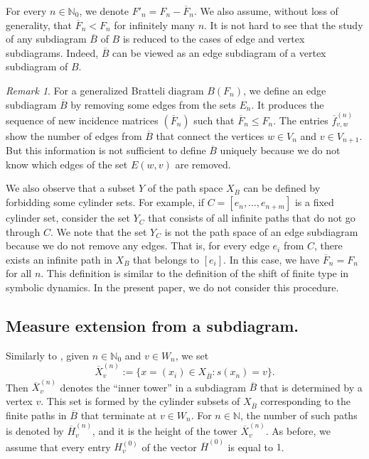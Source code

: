 \documentclass[11pt,reqno]{amsart}
\theoremstyle{definition}
\theoremstyle{remark}
\newtheorem{remark}[definition]{Remark}
\theoremstyle{plain}
\def\ol{\overline}
\newcommand{\N}{\mathbb N}
\numberwithin{equation}{section}
\begin{document}
 For every $n \in \N_0$, we denote $F'_n = F_n - \overline{F}_n$. We also assume, without loss of generality, that  $\overline{F}_n < F_n$ for infinitely many $n$. It is not hard to see that the study of any subdiagram $\ol B$ of $B$ is reduced to the cases of edge and vertex subdiagrams. Indeed, $\ol B$ can be viewed as an edge subdiagram of a vertex subdiagram of $B$.

\begin{remark}\label{rem on edge diagram}
For a generalized Bratteli diagram $B(F_n)$, we define an edge subdiagram $\ol B$ by removing some edges from the sets $E_n$. It produces the sequence of new incidence matrices $(\ol F_n)$ such that $\ol F_n \leq F_n$. The entries $\ol f^{(n)}_{v, w}$ show the number of edges from $\ol B$ that connect the vertices $w \in V_n$ and $v\in V_{n+1}$. But this information is not sufficient to define $\ol B$ uniquely because we do not know which edges of 
the set $E(w, v)$ are removed.

We also observe that a subset $Y$ of the path space $X_B$ can be defined by forbidding some cylinder sets. For example, if $C = [e_n, \ldots, e_{n+m}]$ is a fixed cylinder set, consider the set $Y_C$ that consists of all infinite paths that do not go through $C$. We note that the set $Y_C$ is not the path space of an edge subdiagram because we do not remove any edges. That is, for every edge $e_i$ from $C$, there exists an infinite path in $X_B$ that belongs to $[e_i]$. In this case, we have $\ol F_n = F_n$ for all $n$. This definition is similar to the definition of the shift of finite type in symbolic dynamics. In the present paper, we do not consider this procedure.  
\end{remark}


\subsection{Measure extension from a subdiagram.} 

 Similarly to , given $n \in \N_0$ and $v \in W_n$, we set 
\[
\overline{X}_v^{(n)} := \{x = (x_i)\in X_{\overline B} : s(x_{n}) = v\}.
\]
Then $\overline{X}_v^{(n)}$ denotes the ``inner tower'' in a subdiagram $\overline{B}$ that is determined by a vertex $v$. This set is formed by the cylinder subsets of $X_{\ol B}$ corresponding to the finite paths in $\ol B$ that terminate at $v \in W_n$. For $n \in \N$, the number of such paths is denoted by $\overline{H}_v^{(n)}$, and it is the height of the tower $\ol X_v^{(n)}$. As before, we assume that every entry $H_{v}^{(0)}$ of the vector $\ol H^{(0)}$ is equal to $1$.
\end{document}
